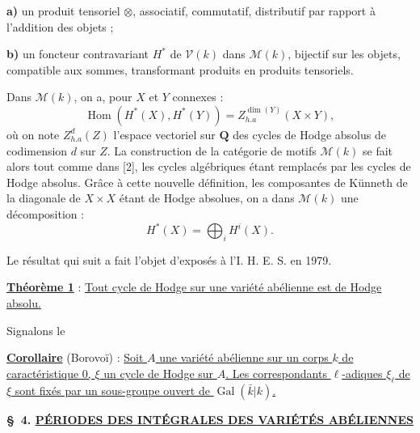 \documentclass[10pt,a4paper]{article}
\newcommand{\Q}{\mathbf Q}
\begin{document}
\textbf{a)} un produit tensoriel $\otimes$, associatif, commutatif, distributif par rapport à l'addition des objets ;

\textbf{b)} un foncteur contravariant $H^*$ de $\mathcal V(k)$ dans $\mathcal M(k)$, bijectif sur les objets, compatible aux sommes, transformant produits en produits tensoriels.

Dans $\mathcal M(k)$, on a, pour $X$ et $Y$ connexes :
\[
\operatorname{Hom}(H^*(X),H^*(Y))=Z_{h.a}^{\dim(Y)}(X\times Y),
\]
où on note $Z_{h.a}^d(Z)$ l'espace vectoriel sur $\Q$ des cycles de Hodge absolus de codimension $d$ sur $Z$. La construction de la catégorie de motifs $\mathcal M(k)$ se fait alors tout comme dans [2], les cycles algébriques étant remplacés par les cycles de Hodge absolus. Grâce à cette nouvelle définition, les composantes de Künneth de la diagonale de $X\times X$ étant de Hodge absolues, on a dans $\mathcal M(k)$ une décomposition :
\[
H^*(X)=\bigoplus_i H^i(X).
\]


\newpage


Le résultat qui suit a fait l'objet d'exposés à l'I. H. E. S. en 1979.

\vspace{0.5em}
\noindent\uline{\textbf{Théorème 1}} : \uline{Tout cycle de Hodge sur une variété abélienne est de Hodge absolu.}

Signalons le

\noindent\uline{\textbf{Corollaire}} (Borovoï) : \uline{Soit $A$ une variété abélienne sur un corps $k$ de caractéristique 0, $\xi$ un cycle de Hodge sur $A$. Les correspondants $\ell$-adiques $\xi_\ell$ de $\xi$ sont fixés par un sous-groupe ouvert de $\operatorname{Gal}(\bar k|k)$.}

\vspace{1em}
\noindent\textbf{\S\ 4. \quad \uline{PÉRIODES DES INTÉGRALES DES VARIÉTÉS ABÉLIENNES}}
\end{document}
